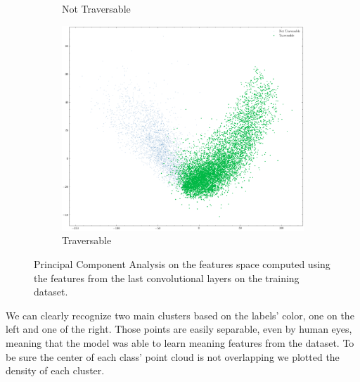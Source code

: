 \documentclass[../document.tex]{subfiles}
\begin{document}
\begin{figure} [htbp]
\begin{subfigure}[b]{0.48\textwidth}
        \caption{Not Traversable}
    \end{subfigure}
    \begin{subfigure}[b]{0.48\textwidth}
        \includegraphics[width=\linewidth]{../img/5/pca/pca-1.png}
        \caption{Traversable}
    \end{subfigure}
\caption{Principal Component Analysis on the features space computed using the features from the last convolutional layers on the training dataset.}
\end{figure}
We can clearly recognize two main clusters based on the labels' color, one on the left and one of the right. Those points are easily separable, even by human eyes, meaning that the model was able to learn meaning features from the dataset.  To be sure the center of each class' point cloud is not overlapping we plotted the density of each cluster.
\end{document}
